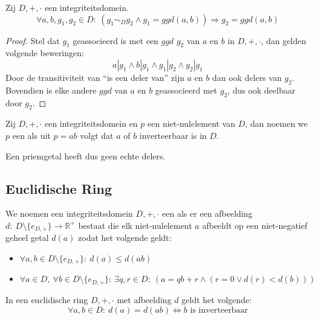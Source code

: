\documentclass[main.tex]{subfiles}
\begin{document}
\begin{st}
  Zij $D,+,\cdot$ een integriteitsdomein.
  \[ \forall a,b,g_{1},g_{2} \in D:\ (g_{1} \sim_{D} g_{2} \wedge g_{1} = ggd(a,b)) \Rightarrow g_{2} = ggd(a,b) \]

  \begin{proof}
    Stel dat $g_{1}$ geassocieerd is met een $ggd$ $g_{2}$ van $a$ en $b$ in $D,+,\cdot$, dan gelden volgende beweringen:
    \[ a | g_{1} \wedge b | g_{1} \wedge g_{1} | g_{2} \wedge g_{2} | g_{1} \]
    Door de transitiviteit van ``is een deler van'' zijn $a$ en $b$ dan ook delers van $g_{2}$.
    Bovendien is elke andere $ggd$ van $a$ en $b$ geassocieerd met $g_{2}$, dus ook deelbaar door $g_{2}$.
  \end{proof}
\end{st}

\begin{de}
  Zij $D,+,\cdot$ een integriteitsdomein en $p$ een niet-nulelement van $D$, dan noemen we $p$ een  als uit $p=ab$ volgt dat $a$ of $b$ inverteerbaar is in $D$.
\end{de}

\begin{opm}
  Een priemgetal heeft dus geen echte delers.
\end{opm}

\subsection{Euclidische Ring}
\label{sec:euclidische-ring}

\begin{de}
  We noemen een integriteitsdomein $D,+,\cdot$ een  als er een afbeelding $d:\ D\setminus \{e_{D,+}\} \rightarrow \mathbb{R}^{+}$ bestaat die elk niet-nulelement $a$ afbeeldt op een niet-negatief geheel getal $d(a)$ zodat het volgende geldt:
\begin{itemize}
\item $\forall a,b \in D\setminus \{e_{D,+}\}:\ d(a) \le d(ab)$
\item $\forall a \in D,\ \forall b\in D\setminus \{e_{D,+}\}:\ \exists q,r \in D:\ (a = qb+r \wedge (r=0 \vee d(r) < d(b)))$
\end{itemize}
\end{de}

\begin{st}
  In een euclidische ring $D,+,\cdot$ met afbeelding $d$ geldt het volgende:
  \[ \forall a,b \in D:\ d(a) = d(ab) \Leftrightarrow b \text{ is inverteerbaar} \]
\end{st}
\end{document}
